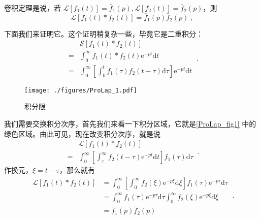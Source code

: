 卷积定理是说，若 $\mathscr L[f_1(t)] = \bar f_1(p), \mathscr L[f_2(t)] = \bar f_2(p)$，则
\begin{equation}
\mathscr L[f_{1}(t) * f_{2}(t) ]= \bar{f}_{1}(p) \bar{f}_{2}(p)~,
\end{equation}

下面我们来证明它。这个证明稍复杂一些，毕竟它是二重积分：
\begin{equation}
\begin{aligned} & \mathscr{S}\left[f_{1}(t) * f_{2}(t)\right] \\=& \int_{0}^{\infty} f_{1}(t) * f_{2}(t) \mathrm{e}^{-p t} \mathrm{d} t \\=& \int_{0}^{\infty}\left[\int_{0}^{t} f_{1}(\tau) f_{2}(t-\tau) \mathrm{d} \tau\right] \mathrm{e}^{-p t} \mathrm{d} t \end{aligned}~.
\end{equation}
\begin{figure}[ht]
\centering
\texttt{[image: ./figures/ProLap\_1.pdf]}
\caption{积分限} \label{ProLap_fig1}
\end{figure}
我们需要交换积分次序，首先我们来看一下积分区域，它就是\autoref{ProLap_fig1} 中的绿色区域。由此可见，现在改变积分次序，就是说
\begin{equation}
\begin{aligned} & \mathscr{L}\left[f_{1}(t) * f_{2}(t)\right] \\=& \int_{0}^{\infty}\left[\int_{\tau}^{\infty} f_{2}(t-\tau) \mathrm{e}^{-p t} \mathrm{d} t\right] f_{1}(\tau) \mathrm{d} \tau \end{aligned}~.
\end{equation}
作换元，$\xi=t-\tau$，那么就有
\begin{equation}
\begin{aligned} \mathscr{L}\left[f_{1}(t) * f_{2}(t)\right] &=\int_{0}^{\infty}\left[\int_{0}^{\infty} f_{2}(\xi) \mathrm{e}^{-p \xi} \mathrm{d} \xi\right] f_{1}(\tau) \mathrm{e}^{-p \tau} \mathrm{d} \tau \\ &=\int_{0}^{\infty} f_{1}(\tau) \mathrm{e}^{-p \tau} \mathrm{d} \tau \int_{0}^{\infty} f_{2}(\xi) \mathrm{e}^{-p \xi} \mathrm{d} \xi \\ &=\bar{f}_{1}(p) \bar{f}_{2}(p) \end{aligned}~.
\end{equation}

